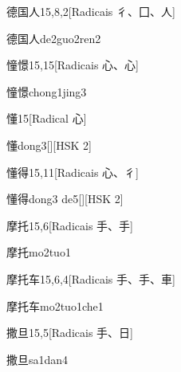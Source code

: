 \begin{entry}{德国人}{15,8,2}[Radicais ⼻、⼞、⼈]
  \begin{phonetics}{德国人}{de2guo2ren2}
  \end{phonetics}
\end{entry}

\begin{entry}{憧憬}{15,15}[Radicais ⼼、⼼]
  \begin{phonetics}{憧憬}{chong1jing3}
  \end{phonetics}
\end{entry}

\begin{entry}{懂}{15}[Radical ⼼]
  \begin{phonetics}{懂}{dong3}[][HSK 2]
  \end{phonetics}
\end{entry}

\begin{entry}{懂得}{15,11}[Radicais ⼼、⼻]
  \begin{phonetics}{懂得}{dong3 de5}[][HSK 2]
  \end{phonetics}
\end{entry}

\begin{entry}{摩托}{15,6}[Radicais ⼿、⼿]
  \begin{phonetics}{摩托}{mo2tuo1}
  \end{phonetics}
\end{entry}

\begin{entry}{摩托车}{15,6,4}[Radicais ⼿、⼿、⾞]
  \begin{phonetics}{摩托车}{mo2tuo1che1}
  \end{phonetics}
\end{entry}

\begin{entry}{撒旦}{15,5}[Radicais ⼿、⽇]
  \begin{phonetics}{撒旦}{sa1dan4}
  \end{phonetics}
\end{entry}

